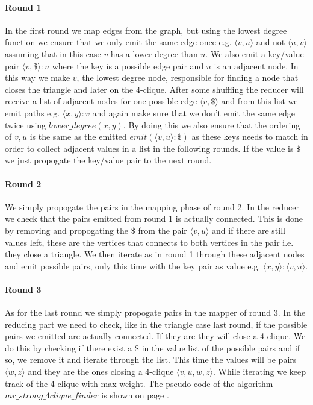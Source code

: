 \documentclass{article}
\begin{document}
\paragraph{Round 1}
In the first round we map edges from the graph, but using the lowest degree function we ensure that we only emit the same edge once e.g. $\langle v,u\rangle$ and not $\langle u,v\rangle$ assuming that in this case $v$ has a lower degree than $u$. We also emit a key/value pair $\langle v,\$\rangle :u$ where the key is a possible edge pair and $u$ is an adjacent node. In this way we make $v$, the lowest degree node, responsible for finding a node that closes the triangle and later on the 4-clique. After some shuffling the reducer will receive a list of adjacent nodes for one possible edge $\langle v,\$\rangle$ and from this list we emit paths e.g. $\langle x,y\rangle :v$ and again make sure that we don't emit the same edge twice using $lower\_degree(x,y)$. By doing this we also ensure that the ordering of $v,u$ is the same as the emitted $emit(\langle v,u\rangle :\$)$ as these keys needs to match in order to collect adjacent values in a list in the following rounds. If the value is $\$$ we just propogate the key/value pair to the next round.

\paragraph{Round 2}
We simply propogate the pairs in the mapping phase of round 2. In the reducer we check that the pairs emitted from round 1 is actually connected. This is done by removing and propogating the $\$$ from the pair $\langle v,u\rangle$ and if there are still values left, these are the vertices that connects to both vertices in the pair i.e. they close a triangle. We then iterate as in round 1 through these adjacent nodes and emit possible pairs, only this time with the key pair as value e.g. $\langle x,y \rangle :\langle v,u \rangle$.

\paragraph{Round 3}
As for the last round we simply propogate pairs in the mapper of round 3. In the reducing part we need to check, like in the triangle case last round, if the possible pairs we emitted are actually connected. If they are they will close a 4-clique. We do this by checking if there exist a $\$$ in the value list of the possible pairs and if so, we remove it and iterate through the list. This time the values will be pairs $\langle w,z \rangle$ and they are the ones closing a 4-clique $\langle v,u,w,z \rangle$. While iterating we keep track of the 4-clique with max weight. The pseudo code of the algorithm $mr\_strong\_4clique\_finder$ is shown on page \pageref{mrAlgorithm}.
\end{document}
